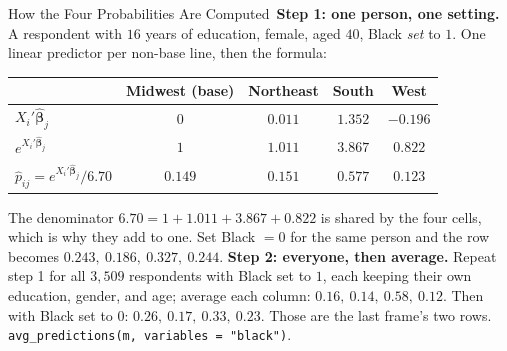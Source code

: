 \documentclass[aspectratio=169,11pt,xcolor=dvipsnames]{beamer}
\newcommand{\core}{\,\raisebox{0.6pt}{\textcolor{corestar}{$\bigstar$}}}
\begin{document}
\begin{frame}{How the Four Probabilities Are Computed\core}
\textbf{Step 1: one person, one setting.} A respondent with $16$ years
of education, female, aged $40$, Black \emph{set} to $1$. One linear
predictor per non-base line, then the formula:
\begin{center}\small
\renewcommand{\arraystretch}{1.0}
\begin{tabular}{lcccc}
\toprule
 & Midwest (base) & Northeast & South & West \\
\midrule
$X_i'\hat{\bm\beta}_j$ & $0$ & $0.011$ & $1.352$ & $-0.196$ \\
$e^{X_i'\hat{\bm\beta}_j}$ & $1$ & $1.011$ & $3.867$ & $0.822$ \\
$\hat p_{ij} = e^{X_i'\hat{\bm\beta}_j}/6.70$ & $0.149$ & $0.151$ & $0.577$ & $0.123$ \\
\bottomrule
\end{tabular}
\end{center}
The denominator $6.70 = 1 + 1.011 + 3.867 + 0.822$ is shared by the four
cells, which is why they add to one. Set Black $= 0$ for the same person
and the row becomes $0.243,\ 0.186,\ 0.327,\ 0.244$.
\vskip2pt
\textbf{Step 2: everyone, then average.} Repeat step 1 for all $3{,}509$
respondents with Black set to $1$, each keeping their own education,
gender, and age; average each column: $0.16,\ 0.14,\ 0.58,\ 0.12$. Then
with Black set to $0$: $0.26,\ 0.17,\ 0.33,\ 0.23$. Those are the last
frame's two rows. \texttt{avg\_predictions(m, variables = "black")}.
\end{frame}
\end{document}
